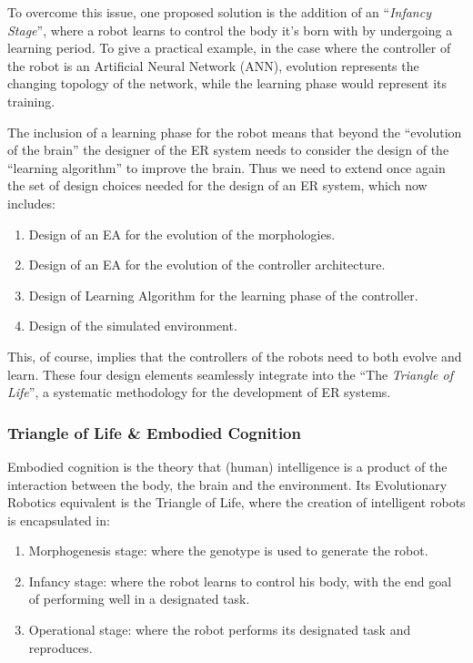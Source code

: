 \documentclass{scrartcl}
\begin{document}
To overcome this issue, one proposed solution is the addition of an ``\textit{Infancy Stage}'', where a robot learns to control the body it's born with by undergoing a learning period.
To give a practical example, in the case where the controller of the robot is an Artificial Neural Network (ANN), evolution represents the changing topology of the network, while the learning phase would represent its training. \\

\newpage

The inclusion of a learning phase for the robot means that beyond the ``evolution of the brain'' the designer of the ER system needs to consider the design of the ``learning algorithm'' to improve the brain.
Thus we need to extend once again the set of design choices needed for the design of an ER system, which now includes:

\begin{enumerate}
  \item Design of an EA for the evolution of the morphologies.
  \item Design of an EA for the evolution of the controller architecture.
  \item Design of Learning Algorithm for the learning phase of the controller.
  \item Design of the simulated environment.
\end{enumerate}

This, of course, implies that the controllers of the robots need to both evolve and learn.
These four design elements seamlessly integrate into the ``The \textit{Triangle of Life}'', a systematic methodology for the development of ER systems.

\subsubsection{Triangle of Life \& Embodied Cognition}

Embodied cognition is the theory that (human) intelligence is a product of the interaction between the body, the brain and the environment.
Its Evolutionary Robotics equivalent is the Triangle of Life, where the creation of intelligent robots is encapsulated in:

\begin{enumerate}
    \item Morphogenesis stage: where the genotype is used to generate the robot.
    \item Infancy stage: where the robot learns to control his body, with the end goal of performing well in a designated task.
    \item Operational stage: where the robot performs its designated task and reproduces.
\end{enumerate}
\end{document}
